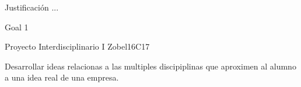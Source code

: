 \begin{syllabus}


\begin{justification}
Justificación ...
\end{justification}

\begin{goals}
\item Goal 1
\end{goals}

\begin{outcomes}
   \item {}
\end{outcomes}

\begin{competences}
    \item {}
\end{competences}

\begin{unit}{Proyecto Interdisciplinario I }{}{Zobel}{16}{C17}
\begin{topics}
      \item Desarrollar ideas relacionas a las multiples discipiplinas  que aproximen al alumno a una idea real de una empresa.
\end{topics}

\begin{learningoutcomes}
   \item 
\end{learningoutcomes}
\end{unit}



\begin{coursebibliography}
\end{coursebibliography}

\end{syllabus}
